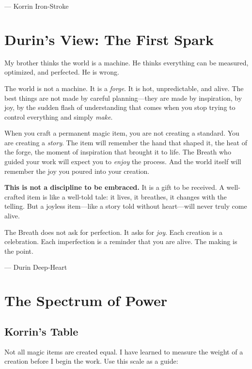 \documentclass[11pt]{book}
\begin{document}
\vspace{0.5cm}
\hfill --- Korrin Iron-Stroke

\section*{Durin's View: The First Spark}

My brother thinks the world is a machine. He thinks everything can be measured, optimized, and perfected. He is wrong.

The world is not a machine. It is a \textit{forge}. It is hot, unpredictable, and alive. The best things are not made by careful planning---they are made by inspiration, by joy, by the sudden flash of understanding that comes when you stop trying to control everything and simply \textit{make}.

When you craft a permanent magic item, you are not creating a standard. You are creating a \textit{story}. The item will remember the hand that shaped it, the heat of the forge, the moment of inspiration that brought it to life. The Breath who guided your work will expect you to \textit{enjoy} the process. And the world itself will remember the joy you poured into your creation.

\textbf{This is not a discipline to be embraced.} It is a gift to be received. A well-crafted item is like a well-told tale: it lives, it breathes, it changes with the telling. But a joyless item---like a story told without heart---will never truly come alive.

The Breath does not ask for perfection. It asks for \textit{joy}. Each creation is a celebration. Each imperfection is a reminder that you are alive. The making is the point.

\vspace{0.5cm}
\hfill --- Durin Deep-Heart

\newpage
\section{The Spectrum of Power}

\subsection*{Korrin's Table}

Not all magic items are created equal. I have learned to measure the weight of a creation before I begin the work. Use this scale as a guide:
\end{document}
